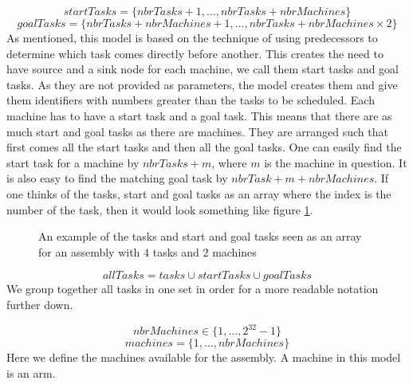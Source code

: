  \begin{equation}\label{eq:19}
 startTasks = \{nbrTasks+1 , \ldots , nbrTasks+nbrMachines\}
 \end{equation}
 \begin{equation}\label{eq:20}
 goalTasks = \{nbrTasks+nbrMachines+1 , \ldots , nbrTasks+nbrMachines \times 2\}
 \end{equation}
  As mentioned, this model is based on the technique of using predecessors to determine which task comes directly before another. This creates the need to have source and a sink node for each machine, we call them start tasks and goal tasks. As they are not provided as parameters, the model creates them and give them identifiers with numbers greater than the tasks to be scheduled. Each machine has to have a start task and a goal task. This means that there are as much start and goal tasks as there are machines. They are arranged such that first comes all the start tasks and then all the goal tasks. One can easily find the start task for a machine by $nbrTasks + m$, where $m$ is the machine in question. It is also easy to find the matching goal task by $nbrTask + m + nbrMachines$. If one thinks of the tasks, start and goal tasks as an array where the index is the number of the task, then it would look something like figure \ref{fig:tasks_array}.
  
\begin{figure}
	\centering
	
	\caption{An example of the tasks and start and goal tasks seen as an array for an assembly with $4$ tasks and $2$ machines}
	\label{fig:tasks_array}
\end{figure}
 
 \begin{equation}\label{eq:21}
 allTasks = tasks \cup startTasks \cup goalTasks
 \end{equation}
 We group together all tasks in one set in order for a more readable notation further down.
 
 \begin{equation}\label{eq:2}
 nbrMachines \in \{1 , \ldots , 2^{32}-1\}
 \end{equation}
 \begin{equation}\label{eq:11}
 machines = \{1 , \ldots , nbrMachines\}
 \end{equation}
 Here we define the machines available for the assembly. A machine in this model is an arm.
 
